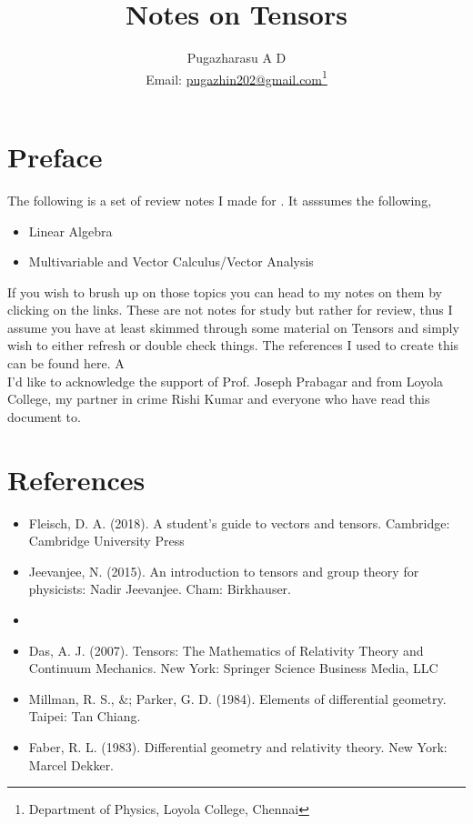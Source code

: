 \documentclass[a4paper,12pt]{book}
\begin{document}
\title{Notes on  Tensors}
\author{Pugazharasu A D \\
	Email: \href{mailto:pugazhin202@gmail.com}{pugazhin202@gmail.com}\footnote{Department of Physics, Loyola College, Chennai}}


\frontmatter
\maketitle 
\nopagebreak
\tableofcontents

\mainmatter

\chapter*{Preface}
The following is a set of review notes I made for . It asssumes the following,
\begin{itemize}
	\item Linear Algebra
	\item Multivariable and Vector Calculus/Vector Analysis
\end{itemize}
If you wish to brush up on those topics you can head to my notes on them by clicking on the links. These are not notes for study but rather for review, thus I assume you have at least skimmed through some material on Tensors and simply wish to either refresh or double check things. The references I used to create this can be found here. A \\
 I'd like to acknowledge the support of Prof. Joseph Prabagar and from Loyola College, my partner in crime Rishi Kumar and everyone who have read this document to. 


\chapter*{References}
\begin{itemize}
	\item Fleisch, D. A. (2018). A student's guide to vectors and tensors. Cambridge: Cambridge University Press
	\item Jeevanjee, N. (2015). An introduction to tensors and group theory for physicists: Nadir Jeevanjee. Cham: Birkhauser.
	\item 
	\item Das, A. J. (2007). Tensors: The Mathematics of Relativity Theory and Continuum Mechanics. New York: Springer Science Business Media, LLC
	\item Millman, R. S., \&; Parker, G. D. (1984). Elements of differential geometry. Taipei: Tan Chiang.
	\item Faber, R. L. (1983). Differential geometry and relativity theory. New York: Marcel Dekker.	
\end{itemize}

\backmatter
\end{document}
